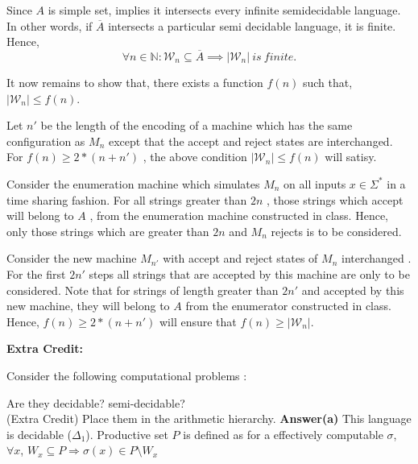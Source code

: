 \documentclass[addpoints,12pt]{exam}
\renewcommand{\W}{\mathcal{W}}
\begin{document}
\begin{questions}
Since $A$ is simple set, implies it intersects every infinite semidecidable language. In other words, if $\overline{A}$ intersects a particular semi decidable
language, it is finite. Hence, \newline
\[ \forall n\in \mathbb{N} : \W_n \subseteq \overline{A} \implies |\W_n|~is~finite. \]

 It now remains to show that, there exists a function $f(n)$ such that, $|\W_n|\leq f(n)$. \newline
 
 Let $n'$ be the length of the encoding of a machine which has the same configuration as $M_{n}$ except that the accept and reject states are interchanged.
 For $f(n) \geq 2*(n+n')$ , the above condition $|\W_n|\leq f(n)$ will satisy. \newline
 
 Consider the enumeration machine which simulates $M_{n}$ on all inputs $x \in \Sigma^{\ast}$ in a time sharing fashion. For all strings greater than
 $2n$ , those strings which accept will belong to $A$ , from the enumeration machine constructed in class. Hence, only those strings which are greater
 than $2n$ and $M_{n}$ rejects is to be considered. \newline
 
 Consider the new machine $M_{n'}$ with accept and reject states of $M_{n}$ interchanged . For the first $2n'$ steps all strings that are accepted by this machine are only to be considered. Note that for strings
 of length greater than $2n'$ and accepted by this new machine, they will belong to $A$ from the enumerator constructed in class. \newline
 Hence, $f(n) \geq 2*(n+n')$ will ensure that $f(n) \geq |\W_n|$.
 \newline
 
 \textbf{Extra Credit:}\newline
 
 
\question[10]
Consider the following computational problems :
Are they decidable? semi-decidable? \\[2mm]
(Extra Credit) Place them in the arithmetic hierarchy. \newline
\textbf{Answer(a)}\newline
This language is  decidable ($\Delta_{1}$). \newline
Productive set $P$ is defined as for a effectively computable $\sigma$, \newline
$\forall x$, $W_{x}\subseteq P \Longrightarrow \sigma (x) \in P \setminus W_{x}$


\end{questions}
\end{document}
